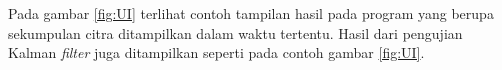 \noindent Pada gambar \ref{fig:UI} terlihat contoh tampilan hasil pada program yang berupa sekumpulan citra ditampilkan dalam waktu tertentu. Hasil dari pengujian Kalman \textit{filter} juga ditampilkan seperti pada contoh gambar \ref{fig:UI}.

\begin{adjustbox}{width=1\textwidth}
\noindent\begin{minipage}{\linewidth}
	\label{fig:UI}
\end{minipage}
\end{adjustbox}

